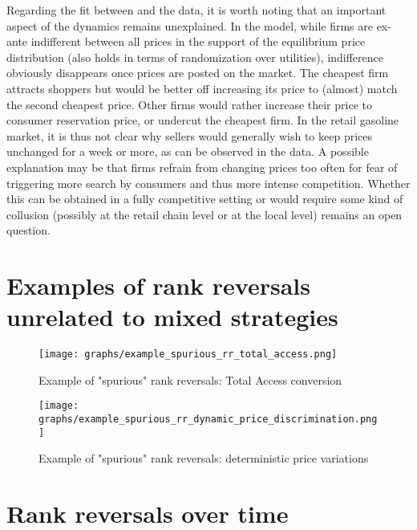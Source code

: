 \documentclass[english]{article}
\begin{document}
Regarding the fit between \cite{VAR80} and the data, it is worth noting that an important aspect of the dynamics remains unexplained. In the model, while firms are ex-ante indifferent between all prices in the support of the equilibrium price distribution (also holds in terms of randomization over utilities), indifference obviously disappears once prices are posted on the market. The cheapest firm attracts shoppers but would be better off increasing its price to (almost) match the second cheapest price. Other firms would rather increase their price to consumer reservation price, or undercut the cheapest firm. In the retail gasoline market, it is thus not clear why sellers would generally wish to keep prices unchanged for a week or more, as can be observed in the data. A possible explanation may be that firms refrain from changing prices too often for fear of triggering more search by consumers and thus more intense competition. Whether this can be obtained in a fully competitive setting  or would require some kind of collusion (possibly at the retail chain level or at the local level) remains an open question.

\newpage



\appendix

\section{Examples of rank reversals unrelated to mixed strategies}

\begin{figure}[htb!]
    \caption{Example of "spurious" rank reversals: Total Access conversion}
	\centering
		\texttt{[image: graphs/example\_spurious\_rr\_total\_access.png]}
\label{fig:rr_total_access}
\end{figure}

\begin{figure}[htb!]
    \caption{Example of "spurious" rank reversals: deterministic price variations}
	\centering
\texttt{[image: graphs/example\_spurious\_rr\_dynamic\_price\_discrimination.png]}
\label{fig:rr_dynamic_price_discrimination}
\end{figure}

\newpage

\section{Rank reversals over time}
\end{document}
